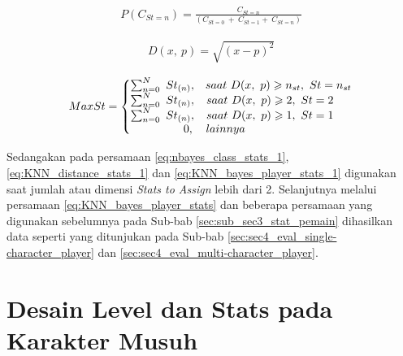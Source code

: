 \begin{equation}\label{eq:nbayes_class_stats_1}
\begin{split}
P(C_{St = n}) = \frac{C_{St = n}}{(C_{St = 0}\ +\ C_{St = 1} +\ C_{St = n})}
\end{split}
\end{equation}

\begin{equation}\label{eq:KNN_distance_stats_1}
\begin{split}
D(x,\ p) = \sqrt{(x - p)^2}
\end{split}
\end{equation}

\begin{equation}\label{eq:KNN_bayes_player_stats_1}
\begin{split}
MaxSt = \left\{\begin{matrix}
\sum_{n = 0}^{N}\ St_{(n)}, & saat\ D(x,\ p) \geqslant n_{st},\ St = n_{st} \\
\sum_{n = 0}^{N}\ St_{(n)}, & \hspace{-1.5em}saat\ D(x,\ p) \geqslant 2,\ St = 2 \\
\sum_{n = 0}^{N}\ St_{(n)}, & \hspace{-1.5em}saat\ D(x,\ p) \geqslant 1,\ St = 1 \\
\hspace{4.5em} 0, 			& \hspace{-9.3em} lainnya
\end{matrix}\right.
\end{split}
\end{equation}
\vspace{1ex}

Sedangakan pada persamaan \ref{eq:nbayes_class_stats_1}, \ref{eq:KNN_distance_stats_1} dan \ref{eq:KNN_bayes_player_stats_1} digunakan saat jumlah atau dimensi \textit{Stats to Assign} lebih dari 2. Selanjutnya melalui persamaan \ref{eq:KNN_bayes_player_stats} dan beberapa persamaan yang digunakan sebelumnya pada Sub-bab \ref{sec:sub_sec3_stat_pemain} dihasilkan data seperti yang ditunjukan pada Sub-bab \ref{sec:sec4_eval_single-character_player} dan \ref{sec:sec4_eval_multi-character_player}.
\vspace{1ex}

\section{Desain Level dan Stats pada Karakter Musuh}
\label{sec:sec3_enemy_stats}
\vspace{1ex}

